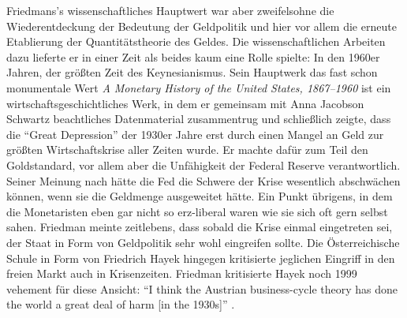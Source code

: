 Friedmans's wissenschaftliches Hauptwert war aber zweifelsohne die Wiederentdeckung der Bedeutung der Geldpolitik und hier vor allem die erneute Etablierung der Quantitätstheorie des Geldes. Die wissenschaftlichen Arbeiten dazu lieferte er in einer Zeit als beides kaum eine Rolle spielte: In den 1960er Jahren, der größten Zeit des Keynesianismus. Sein Hauptwerk das fast schon monumentale Wert \textit{A Monetary History of the United States, 1867–1960} ist ein wirtschaftsgeschichtliches Werk, in dem er gemeinsam mit Anna Jacobson Schwartz beachtliches Datenmaterial zusammentrug und schließlich zeigte, dass die "`Great Depression"' der 1930er Jahre erst durch einen Mangel an Geld zur größten Wirtschaftskrise aller Zeiten wurde. Er machte dafür zum Teil den Goldstandard, vor allem aber die Unfähigkeit der Federal Reserve verantwortlich. Seiner Meinung nach hätte die Fed die Schwere der Krise wesentlich abschwächen können, wenn sie die Geldmenge ausgeweitet hätte. Ein Punkt übrigens, in dem die Monetaristen eben gar nicht so erz-liberal waren wie sie sich oft gern selbst sahen. Friedman meinte zeitlebens, dass sobald die Krise einmal eingetreten sei, der Staat in Form von Geldpolitik sehr wohl eingreifen sollte. Die Österreichische Schule in Form von Friedrich Hayek hingegen kritisierte jeglichen Eingriff in den freien Markt auch in Krisenzeiten. Friedman kritisierte Hayek noch 1999 vehement für diese Ansicht: "`I think the Austrian business-cycle theory has done the world a great deal of harm [in the 1930s]"' \parencite{Epstein1999}.


